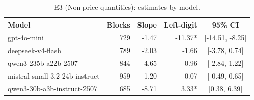 \begin{table}[t]
\centering
\caption{E3 (Non-price quantities): estimates by model.}
\label{tab:e3model}
\small
\begin{tabular}{lrrrc}
\toprule
Model & Blocks & Slope & Left-digit & 95\% CI \\
\midrule
gpt-4o-mini & 729 & -1.47 & -11.37* & [-14.51, -8.25] \\
deepseek-v4-flash & 789 & -2.03 & -1.66 & [-3.78, 0.74] \\
qwen3-235b-a22b-2507 & 844 & -4.65 & -0.96 & [-2.84, 1.22] \\
mistral-small-3.2-24b-instruct & 959 & -1.20 & 0.07 & [-0.49, 0.65] \\
qwen3-30b-a3b-instruct-2507 & 685 & -8.71 & 3.33* & [0.38, 6.39] \\
\bottomrule
\end{tabular}
\end{table}
